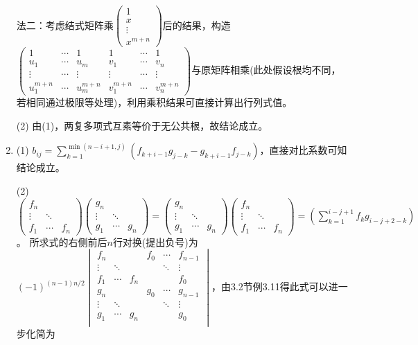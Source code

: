 \documentclass[a4paper,UTF8,fontset=windows]{ctexart}
\begin{document}
\begin{enumerate}
法二：考虑结式矩阵乘$\begin{pmatrix}1\\x\\\vdots\\x^{m+n}\end{pmatrix}$后的结果，构造$\begin{pmatrix}1&\cdots&1&1&\cdots&1\\u_1&\cdots&u_m&v_1&\cdots&v_n\\\vdots&\cdots&\vdots&\vdots&\cdots&\vdots\\u_1^{m+n}&\cdots&u_m^{m+n}&v_1^{m+n}&\cdots&v_n^{m+n}\end{pmatrix}$与原矩阵相乘(此处假设根均不同，若相同通过极限等处理)，利用乘积结果可直接计算出行列式值。

(2) 由(1)，两复多项式互素等价于无公共根，故结论成立。

\item
(1) $b_{ij}=\sum_{k=1}^{\min(n-i+1,j)}(f_{k+i-1}g_{j-k}-g_{k+i-1}f_{j-k})$，直接对比系数可知结论成立。

(2) $\begin{pmatrix}f_n&&\\\vdots&\ddots&\\f_1&\cdots&f_n\end{pmatrix}\begin{pmatrix}g_n&&\\\vdots&\ddots&\\g_1&\cdots&g_n\end{pmatrix}=\begin{pmatrix}g_n&&\\\vdots&\ddots&\\g_1&\cdots&g_n\end{pmatrix}\begin{pmatrix}f_n&&\\\vdots&\ddots&\\f_1&\cdots&f_n\end{pmatrix}=\left(\sum_{k=1}^{i-j+1}f_kg_{i-j+2-k}\right)$。
所求式的右侧前后$n$行对换(提出负号)为$(-1)^{(n-1)n/2}\begin{vmatrix}f_n&&&f_0&\cdots&f_{n-1}\\\vdots&\ddots&&&\ddots&\vdots\\f_1&\cdots&f_n&&&f_0\\g_n&&&g_0&\cdots&g_{n-1}\\\vdots&\ddots&&&\ddots&\vdots\\g_1&\cdots&g_n&&&g_0\\\end{vmatrix}$，由3.2节例3.11得此式可以进一步化简为


\end{enumerate}
\end{document}
